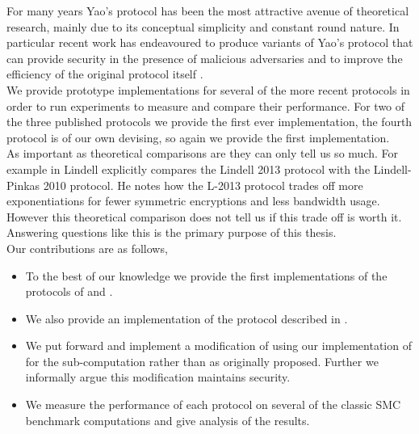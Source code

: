 \documentclass[ %
                    author={Nicholas Tutte},
                supervisor={Prof. Nigel Smart},
                    degree={MEng},
                     title={Secure Two Party Computation},
                  subtitle={A practical comparison of recent protocols},
                      type={Research - GG1K},
                      year={2015} ]{dissertation}
\begin{document}
		For many years Yao's protocol \cite{YaoOriginal} has been the most attractive avenue of theoretical research, mainly due to its conceptual simplicity and constant round nature. In particular recent work has endeavoured to produce variants of Yao's protocol that can provide security in the presence of malicious adversaries \cite{LindellAndPinkas2007, LindellAndPinkas2011, Lindell_CnC_2013, Katz_Symm_CnC_2013, OnCommittedInputs, LEGO_Paper, MiniLEGO} and to improve the efficiency of the original protocol itself \cite{SMC_Is_Practical, FreeXOR}.\\

		We provide prototype implementations for several of the more recent protocols in order to run experiments to measure and compare their performance. For two of the three published protocols we provide the first ever implementation, the fourth protocol is of our own devising, so again we provide the first implementation.\\

		As important as theoretical comparisons are they can only tell us so much. For example in \cite{Lindell_CnC_2013} Lindell explicitly compares the Lindell 2013 protocol with the Lindell-Pinkas 2010 protocol. He notes how the L-2013 protocol trades off more exponentiations for fewer symmetric encryptions and less bandwidth usage. However this theoretical comparison does not tell us if this trade off is worth it. Answering questions like this is the primary purpose of this thesis.\\

		Our contributions are as follows,

		\begin{itemize}
			\item To the best of our knowledge we provide the first implementations of the protocols of \cite{LindellAndPinkas2011} and \cite{Lindell_CnC_2013}.
			\item We also provide an implementation of the protocol described in \cite{Katz_Symm_CnC_2013}. 
			\item We put forward and implement a modification of \cite{Lindell_CnC_2013} using our implementation of \cite{Katz_Symm_CnC_2013} for the sub-computation rather than \cite{LindellAndPinkas2011} as originally proposed. Further we informally argue this modification maintains security.
			\item We measure the performance of each protocol on several of the classic SMC benchmark computations and give analysis of the results.
		\end{itemize}
\end{document}

